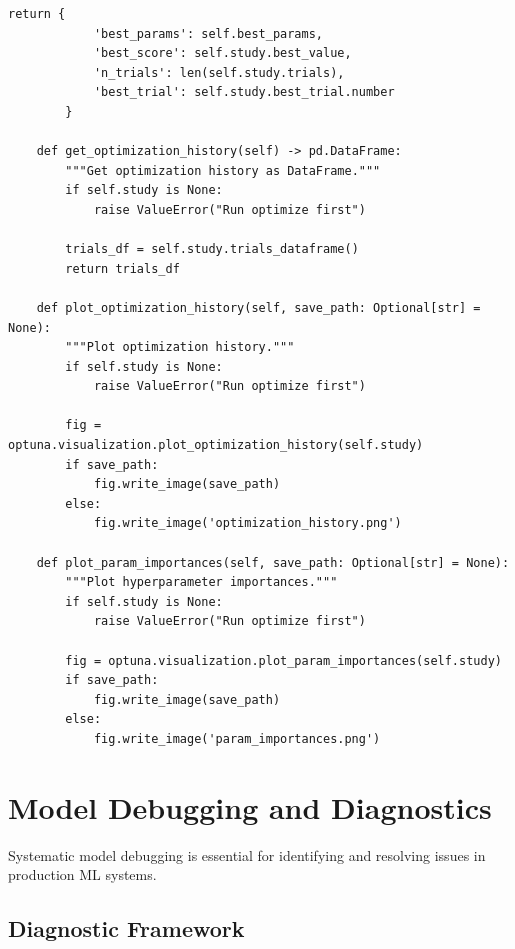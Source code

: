 \begin{lstlisting}[style=python, caption={Advanced Hyperparameter Optimization with Early Stopping and Multi-Fidelity}]
        return {
            'best_params': self.best_params,
            'best_score': self.study.best_value,
            'n_trials': len(self.study.trials),
            'best_trial': self.study.best_trial.number
        }

    def get_optimization_history(self) -> pd.DataFrame:
        """Get optimization history as DataFrame."""
        if self.study is None:
            raise ValueError("Run optimize first")

        trials_df = self.study.trials_dataframe()
        return trials_df

    def plot_optimization_history(self, save_path: Optional[str] = None):
        """Plot optimization history."""
        if self.study is None:
            raise ValueError("Run optimize first")

        fig = optuna.visualization.plot_optimization_history(self.study)
        if save_path:
            fig.write_image(save_path)
        else:
            fig.write_image('optimization_history.png')

    def plot_param_importances(self, save_path: Optional[str] = None):
        """Plot hyperparameter importances."""
        if self.study is None:
            raise ValueError("Run optimize first")

        fig = optuna.visualization.plot_param_importances(self.study)
        if save_path:
            fig.write_image(save_path)
        else:
            fig.write_image('param_importances.png')
\end{lstlisting}

\section{Model Debugging and Diagnostics}

Systematic model debugging is essential for identifying and resolving issues in production ML systems.

\subsection{Diagnostic Framework}

